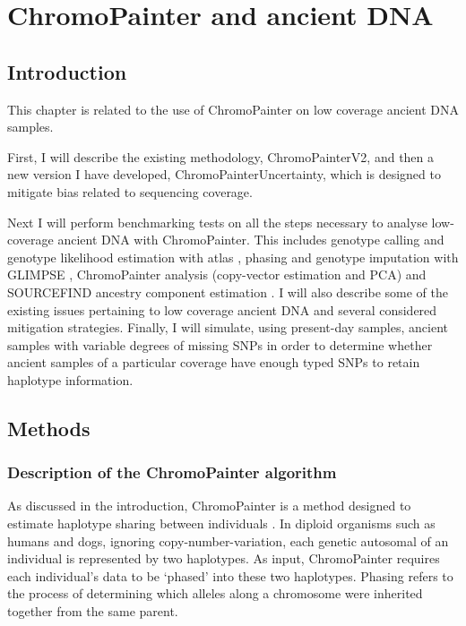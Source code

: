 \chapter{ChromoPainter and ancient DNA}
\label{chapterlabel2}

\section{Introduction}

This chapter is related to the use of ChromoPainter on low coverage ancient DNA samples. 

First, I will describe the existing methodology, ChromoPainterV2, and then a new version I have developed, ChromoPainterUncertainty, which is designed to mitigate bias related to sequencing coverage. 

Next I will perform benchmarking tests on all the steps necessary to analyse low-coverage ancient DNA with ChromoPainter. This includes genotype calling and genotype likelihood estimation with atlas \cite{Link2017}, phasing and genotype imputation with GLIMPSE \cite{rubinacci2021efficient}, ChromoPainter \cite{Lawson2012} analysis (copy-vector estimation and PCA) and SOURCEFIND ancestry component estimation \cite{Chacon-Duque2018}. I will also describe some of the existing issues pertaining to low coverage ancient DNA and several considered mitigation strategies. Finally, I will simulate, using present-day samples, ancient samples with variable degrees of missing SNPs in order to determine whether ancient samples of a particular coverage have enough typed SNPs to retain haplotype information.   

\section{Methods}

\subsection{Description of the ChromoPainter algorithm} \label{sec:ChromopainterDescription}

As discussed in the introduction, ChromoPainter is a method designed to estimate haplotype sharing between individuals \cite{Lawson2012}. In diploid organisms such as humans and dogs, ignoring copy-number-variation, each genetic autosomal of an individual is represented by two haplotypes. As input, ChromoPainter requires each individual's data to be `phased' into these two haplotypes. Phasing refers to the process of determining which alleles along a chromosome were inherited together from the same parent. 

